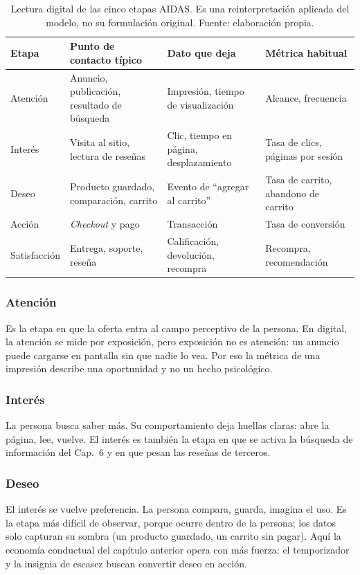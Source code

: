 \begin{table}[!htb]
\centering
\begin{tabular}{@{}p{2.1cm}p{3.6cm}p{3.5cm}p{3.3cm}@{}}
\toprule
Etapa & Punto de contacto típico & Dato que deja & Métrica habitual \\
\midrule
Atención & Anuncio, publicación, resultado de búsqueda & Impresión, tiempo de visualización & Alcance, frecuencia \\
Interés & Visita al sitio, lectura de reseñas & Clic, tiempo en página, desplazamiento & Tasa de clics, páginas por sesión \\
Deseo & Producto guardado, comparación, carrito & Evento de \enquote{agregar al carrito} & Tasa de carrito, abandono de carrito \\
Acción & \textit{Checkout} y pago & Transacción & Tasa de conversión \\
Satisfacción & Entrega, soporte, reseña & Calificación, devolución, recompra & Recompra, recomendación \\
\bottomrule
\end{tabular}
\caption{Lectura digital de las cinco etapas AIDAS. Es una reinterpretación
aplicada del modelo, no su formulación original. Fuente: elaboración propia.}
\label{tab:cap07-aidas}
\end{table}

\subsubsection{Atención}
Es la etapa en que la oferta entra al campo perceptivo de la persona. En
digital, la atención se mide por exposición, pero exposición no es atención:
un anuncio puede cargarse en pantalla sin que nadie lo vea. Por eso la
métrica de una impresión describe una oportunidad y no un hecho psicológico.

\subsubsection{Interés}
La persona busca saber más. Su comportamiento deja huellas claras: abre la
página, lee, vuelve. El interés es también la etapa en que se activa la
búsqueda de información del Cap.~6 y en que pesan las reseñas de terceros.

\subsubsection{Deseo}
El interés se vuelve preferencia. La persona compara, guarda, imagina el
uso. Es la etapa más difícil de observar, porque ocurre dentro de la persona;
los datos solo capturan su sombra (un producto guardado, un carrito sin
pagar). Aquí la economía conductual del capítulo anterior
opera con más fuerza: el temporizador y la insignia de escasez buscan
convertir deseo en acción.

